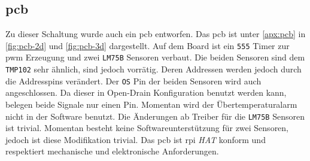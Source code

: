 \subsection{\acrshort{pcb}}

Zu dieser Schaltung wurde auch ein \gls{pcb} entworfen.
Das \gls{pcb} ist unter \autoref{apx:pcb} in \autoref{fig:pcb-2d} und \autoref{fig:pcb-3d} dargestellt.
Auf dem Board ist ein \texttt{555} Timer zur \gls{pwm} Erzeugung und zwei \texttt{LM75B} Sensoren verbaut.
Die beiden Sensoren sind dem \texttt{TMP102} sehr ähnlich, sind jedoch vorrätig.
Deren Addressen werden jedoch durch die Addresspins verändert.
Der \texttt{OS} Pin der beiden Sensoren wird auch angeschlossen.
Da dieser in Open-Drain Konfiguration benutzt werden kann, belegen beide Signale nur einen Pin.
Momentan wird der Übertemperaturalarm nicht in der Software benutzt.
Die Änderungen ab Treiber für die \texttt{LM75B} Sensoren ist trivial.
Momentan besteht keine Softwareunterstützung für zwei Sensoren, jedoch ist diese Modifikation trivial.
Das \gls{pcb} ist \gls{rpi} \textit{HAT} konform und respektiert mechanische und elektronische Anforderungen.
